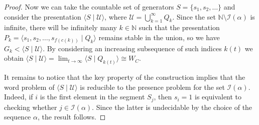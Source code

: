 \documentclass[10pt,a4paper]{amsart}
\begin{document}
\begin{proof}
\smallskip
Now we can take the countable set of generators $S=\{s_1,s_2,\ldots \}$ and consider the presentation $\langle S \mid \mathcal U\rangle$, where $\mathcal U = \bigcup_{k=1}^{\infty} Q_k$. Since the set $\mathbb N\setminus \mathcal{I}(\alpha)$ is infinite, there will be infinitely many $k\in \mathbb N$ such that the presentation $P_k=\langle s_1,s_2,\ldots,s_{f(c(k))} \mid Q_k \rangle$ remains stable in the union, so we have $G_k<\langle S \mid \mathcal U \rangle$. By considering an increasing subsequence of such indices $k(t)$ we obtain $\langle S \mid \mathcal U \rangle = \lim_{t\to \infty} \langle S\mid Q_{k(t)} \rangle \cong W_C$. 

It remains to notice that the key property of the construction implies that the word problem of $\langle S \mid \mathcal U\rangle$ is reducible to the presence problem for the set $\mathcal{I}(\alpha)$. Indeed, if $i$ is the first element in the segment $S_j$, then $s_i=1$ is equivalent to checking whether $j\in\mathcal I(\alpha)$. Since the latter is undecidable by the choice of the sequence $\alpha$, the result follows.
\end{proof}
\end{document}
